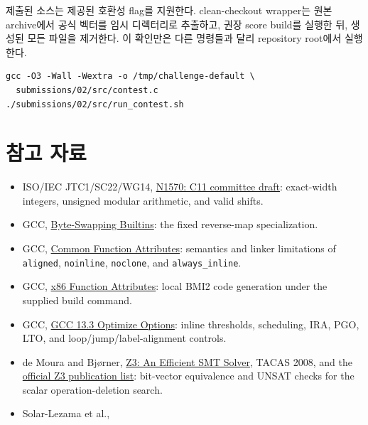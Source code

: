 \documentclass[11pt,a4paper]{article}
\begin{document}
제출된 소스는 제공된 호환성 flag를 지원한다.  clean-checkout wrapper는
원본 archive에서 공식 벡터를 임시 디렉터리로 추출하고, 권장 score
build를 실행한 뒤, 생성된 모든 파일을 제거한다.  이 확인만은 다른
명령들과 달리 repository root에서 실행한다.

\begin{lstlisting}
gcc -O3 -Wall -Wextra -o /tmp/challenge-default \
  submissions/02/src/contest.c
./submissions/02/src/run_contest.sh
\end{lstlisting}

\section{참고 자료}


{\small
\begin{itemize}
  \setlength{\itemsep}{2pt}
  \setlength{\parskip}{0pt}
  \setlength{\parsep}{0pt}
  \item ISO/IEC JTC1/SC22/WG14,
    \href{https://www.open-std.org/jtc1/sc22/wg14/www/docs/n1570.pdf}
    {N1570: C11 committee draft}: exact-width integers, unsigned modular
    arithmetic, and valid shifts.
  \item GCC,
    \href{https://gcc.gnu.org/onlinedocs/gcc/Byte-Swapping-Builtins.html}
    {Byte-Swapping Builtins}: the fixed reverse-map specialization.
  \item GCC,
    \href{https://gcc.gnu.org/onlinedocs/gcc/Common-Function-Attributes.html}
    {Common Function Attributes}: semantics and linker limitations of
    \texttt{aligned}, \texttt{noinline}, \texttt{noclone}, and
    \texttt{always\_inline}.
  \item GCC,
    \href{https://gcc.gnu.org/onlinedocs/gcc/x86-Function-Attributes.html}
    {x86 Function Attributes}: local BMI2 code generation under the supplied
    build command.
  \item GCC,
    \href{https://gcc.gnu.org/onlinedocs/gcc-13.3.0/gcc/Optimize-Options.html}
    {GCC 13.3 Optimize Options}: inline thresholds, scheduling, IRA, PGO, LTO,
    and loop/jump/label-alignment controls.
  \item de Moura and Bj\o{}rner,
    \href{https://doi.org/10.1007/978-3-540-78800-3_24}
    {Z3: An Efficient SMT Solver}, TACAS 2008, and the
    \href{https://www.microsoft.com/en-us/research/project/z3-3/publications/}
    {official Z3 publication list}: bit-vector equivalence and UNSAT checks
    for the scalar operation-deletion search.
  \item Solar-Lezama et al.,

\end{itemize}}
\end{document}
